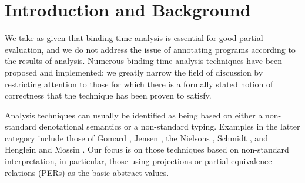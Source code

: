 \date{}
\maketitle

\begin{abstract}

{\it First-order\/} projection-based binding-time analysis has proven
genuinely useful in partial evaluation \cite{Lau91a,Lau91c}.  There
have been three notable generalisations of projection-based analysis to
higher order.  The first lacked a formal basis \cite{Mog89}; the second
used structures strictly more general that projections, namely {\it
partial equivalence relations\/} (PERs) \cite{HS91}; the third involved
a complex construction that gave rise to impractically large abstract
domains \cite{Dav93b}.  This paper presents a technique free of
these shortcomings:  it is simple, entirely projection-based,
satisfies a formal correctness condition, and gives rise to reasonably
small abstract domains.  Though the technique is cast in terms of
projections, there is also an interpretation in terms of PERs.
The principal limitation of the technique is the restriction to
{\it monomorphic\/} typing.

\end{abstract}



\section{Introduction and Background}

We take as given that binding-time analysis is essential for good
partial evaluation, and we do not address the issue of annotating
programs according to the results of analysis.  Numerous binding-time
analysis techniques have been proposed and implemented; we greatly
narrow the field of discussion by restricting attention to those for
which there is a formally stated notion of correctness that the
technique has been proven to satisfy.

Analysis techniques can usually be identified as being based on either a
non-standard denotational semantics or a non-standard typing.  Examples
in the latter category include those of Gomard \cite{Go92}, Jensen
\cite{Jen92}, the Nielsons \cite{NN88}, Schmidt \cite{Sch88}, and
Henglein and Mossin \cite{HM94}.  Our
focus is on those techniques based on non-standard interpretation, in
particular, those using projections or partial equivalence relations
(PERs) as the basic abstract values.

